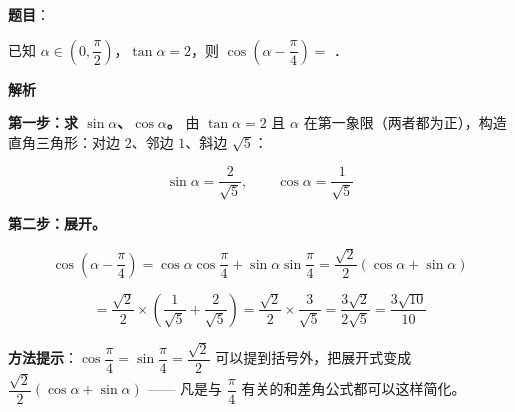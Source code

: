 \begin{answer}

\textbf{题目}：

已知 $\alpha\in\left(0,\dfrac\pi2\right)$，$\tan\alpha=2$，则 $\cos\left(\alpha-\dfrac\pi4\right)=$ \gkblank{}．

\textbf{解析}

\textbf{第一步：求 $\sin\alpha$、$\cos\alpha$。} 由 $\tan\alpha=2$ 且 $\alpha$ 在第一象限（两者都为正），构造直角三角形：对边 $2$、邻边 $1$、斜边 $\sqrt5$：

\nopagebreak[4]
\[\sin\alpha=\frac2{\sqrt5},\qquad \cos\alpha=\frac1{\sqrt5}\]

\textbf{第二步：展开。}

\nopagebreak[4]
\[\cos\left(\alpha-\frac\pi4\right)=\cos\alpha\cos\frac\pi4+\sin\alpha\sin\frac\pi4=\frac{\sqrt2}2\left(\cos\alpha+\sin\alpha\right)\]

\nopagebreak[4]
\[=\frac{\sqrt2}2\times\left(\frac1{\sqrt5}+\frac2{\sqrt5}\right)=\frac{\sqrt2}2\times\frac3{\sqrt5}=\frac{3\sqrt2}{2\sqrt5}=\frac{3\sqrt{10}}{10}\]

\begin{gktip}
\textbf{方法提示}：$\cos\dfrac\pi4=\sin\dfrac\pi4=\dfrac{\sqrt2}2$ 可以提到括号外，把展开式变成 $\dfrac{\sqrt2}2(\cos\alpha+\sin\alpha)$ —— 凡是与 $\dfrac\pi4$ 有关的和差角公式都可以这样简化。
\end{gktip}


\par\medskip

\end{answer}
